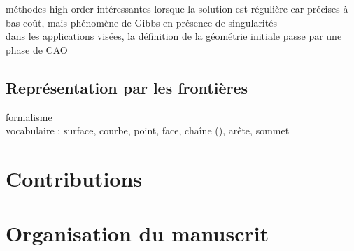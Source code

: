 méthodes high-order intéressantes lorsque la solution est régulière car précises à bas coût, mais phénomène de Gibbs en présence de singularités \cite{bruno2007}\\

dans les applications visées, la définition de la géométrie initiale passe par une phase de CAO


\subsection*{Représentation par les frontières}
formalisme \brep~ \cite[Section 2.2]{pentcheva2010}\\
vocabulaire : surface, courbe, point, face, chaîne (), arête, sommet


\section*{Contributions}%


\section*{Organisation du manuscrit}